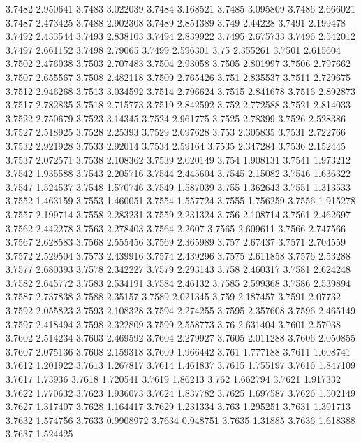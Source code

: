 3.7482  2.950641
3.7483  3.022039
3.7484  3.168521
3.7485  3.095809
3.7486  2.666021
3.7487  2.473425
3.7488  2.902308
3.7489  2.851389
3.749  2.44228
3.7491  2.199478
3.7492  2.433544
3.7493  2.838103
3.7494  2.839922
3.7495  2.675733
3.7496  2.542012
3.7497  2.661152
3.7498  2.79065
3.7499  2.596301
3.75  2.355261
3.7501  2.615604
3.7502  2.476038
3.7503  2.707483
3.7504  2.93058
3.7505  2.801997
3.7506  2.797662
3.7507  2.655567
3.7508  2.482118
3.7509  2.765426
3.751  2.835537
3.7511  2.729675
3.7512  2.946268
3.7513  3.034592
3.7514  2.796624
3.7515  2.841678
3.7516  2.892873
3.7517  2.782835
3.7518  2.715773
3.7519  2.842592
3.752  2.772588
3.7521  2.814033
3.7522  2.750679
3.7523  3.14345
3.7524  2.961775
3.7525  2.78399
3.7526  2.528386
3.7527  2.518925
3.7528  2.25393
3.7529  2.097628
3.753  2.305835
3.7531  2.722766
3.7532  2.921928
3.7533  2.92014
3.7534  2.59164
3.7535  2.347284
3.7536  2.152445
3.7537  2.072571
3.7538  2.108362
3.7539  2.020149
3.754  1.908131
3.7541  1.973212
3.7542  1.935588
3.7543  2.205716
3.7544  2.445604
3.7545  2.15082
3.7546  1.636322
3.7547  1.524537
3.7548  1.570746
3.7549  1.587039
3.755  1.362643
3.7551  1.313533
3.7552  1.463159
3.7553  1.460051
3.7554  1.557724
3.7555  1.756259
3.7556  1.915278
3.7557  2.199714
3.7558  2.283231
3.7559  2.231324
3.756  2.108714
3.7561  2.462697
3.7562  2.442278
3.7563  2.278403
3.7564  2.2607
3.7565  2.609611
3.7566  2.747566
3.7567  2.628583
3.7568  2.555456
3.7569  2.365989
3.757  2.67437
3.7571  2.704559
3.7572  2.529504
3.7573  2.439916
3.7574  2.439296
3.7575  2.611858
3.7576  2.53288
3.7577  2.680393
3.7578  2.342227
3.7579  2.293143
3.758  2.460317
3.7581  2.624248
3.7582  2.645772
3.7583  2.534191
3.7584  2.46132
3.7585  2.599368
3.7586  2.539894
3.7587  2.737838
3.7588  2.35157
3.7589  2.021345
3.759  2.187457
3.7591  2.07732
3.7592  2.055823
3.7593  2.108328
3.7594  2.274255
3.7595  2.357608
3.7596  2.465149
3.7597  2.418494
3.7598  2.322809
3.7599  2.558773
3.76  2.631404
3.7601  2.57038
3.7602  2.514234
3.7603  2.469592
3.7604  2.279927
3.7605  2.011288
3.7606  2.050855
3.7607  2.075136
3.7608  2.159318
3.7609  1.966442
3.761  1.777188
3.7611  1.608741
3.7612  1.201922
3.7613  1.267817
3.7614  1.461837
3.7615  1.755197
3.7616  1.847109
3.7617  1.73936
3.7618  1.720541
3.7619  1.86213
3.762  1.662794
3.7621  1.917332
3.7622  1.770632
3.7623  1.936073
3.7624  1.837782
3.7625  1.697587
3.7626  1.502149
3.7627  1.317407
3.7628  1.164417
3.7629  1.231334
3.763  1.295251
3.7631  1.391713
3.7632  1.574756
3.7633  0.9908972
3.7634  0.948751
3.7635  1.31885
3.7636  1.618388
3.7637  1.524425

